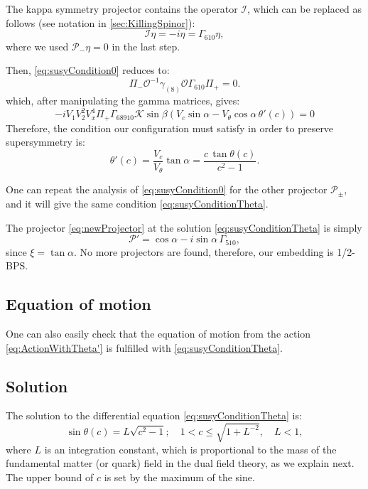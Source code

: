 The kappa symmetry projector contains the operator $\mathcal{I}$, which can be replaced as follows (see notation in \ref{sec:KillingSpinor}):
\begin{equation}
 \mathcal{I}\eta =-i \eta = \Gamma_{610} \eta,
\end{equation}
where we used $\mathcal{P}_- \eta =0$ in the last step. 

Then, \eqref{eq:susyCondition0} reduces to:
\begin{equation}
 \Pi_{-} \mathcal{O}^{-1} \gamma_{(8)} \mathcal{O} \Gamma_{610} \Pi_{+}  = 0.
\end{equation}
which, after manipulating the gamma matrices, gives:
\begin{equation}
-i V_1 V_2^2 V_x^4 \Pi_+ \Gamma_{6 8 9 10} \mathcal{K} \sin\beta \left(V_c \sin\alpha - V_\theta \cos\alpha \, \theta'(c)\right) = 0
\end{equation}
Therefore, the condition our configuration must satisfy in order to preserve supersymmetry is:
\begin{equation}\label{eq:susyConditionTheta}
 \theta'(c) = \dfrac{V_c}{V_\theta} \tan\alpha = \dfrac{c \, \tan\theta(c)}{c^2-1} .
\end{equation}


One can repeat the analysis of \eqref{eq:susyCondition0} for the other projector $\mathcal{P}_{\pm}$, and it will give the same condition \eqref{eq:susyConditionTheta}.


The projector \eqref{eq:newProjector} at the solution \eqref{eq:susyConditionTheta} is simply
\begin{equation}
\mathcal{P}' = \cos \alpha - i \sin \alpha \, \Gamma_{510},
\end{equation}
since $ \xi =  \tan \alpha $.
No more projectors are found, therefore, our embedding is 1/2-BPS.


\subsection{Equation of motion}

One can also easily check that the equation of motion from the action \eqref{eq:ActionWithTheta'} is fulfilled with \eqref{eq:susyConditionTheta}.



\subsection{Solution}

The solution to the differential equation \eqref{eq:susyConditionTheta} is:
\begin{equation}\label{eq:susyConditionSolution}
\boxed{\sin\theta(c) = L \sqrt{c^2-1}; \quad 1 < c \leq \sqrt{1+L^{-2}}, \quad L < 1},
\end{equation}
where $L$ is an integration constant, which is proportional to the mass of the fundamental matter (or quark) field in the dual field theory, as we explain next. The upper bound of $c$ is set by the maximum of the sine.

